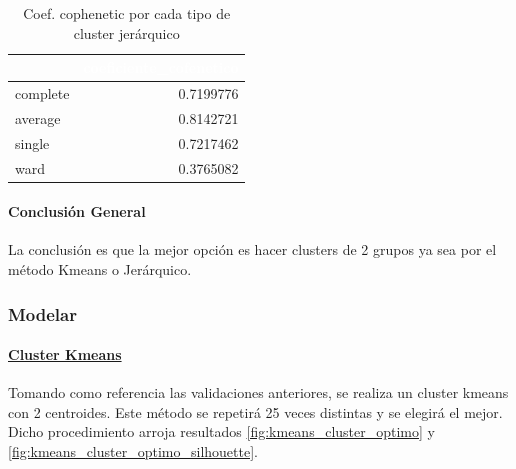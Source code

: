 \begin{table}[!h]
	
	\caption{\label{tab:tabla_cophenetic_jerarquico}Coef. cophenetic por cada tipo de cluster jerárquico}
	\centering
	\begin{tabular}[t]{lr}
		\toprule
		\rowcolor{black}  \multicolumn{1}{c}{\textcolor{white}{\textbf{metodo}}} & \multicolumn{1}{c}{\textcolor{white}{\textbf{coeficiente\_cofenetico}}}\\
		\midrule
		\rowcolor{gray!6}  complete & 0.7199776\\
		average & 0.8142721\\
		\rowcolor{gray!6}  single & 0.7217462\\
		ward & 0.3765082\\
		\bottomrule
	\end{tabular}
\end{table}



\paragraph{\textbf{Conclusión General}}
La conclusión es que la mejor opción es hacer clusters de 2 grupos ya sea por el método Kmeans o Jerárquico.


\subsubsection{\textbf{Modelar}}

\paragraph{\underline{\textbf{Cluster Kmeans}}}\label{cluster-kmeans}

Tomando como referencia las validaciones anteriores, se realiza un
cluster kmeans con 2 centroides. Este método se repetirá 25 veces
distintas y se elegirá el mejor.\\
Dicho procedimiento arroja resultados \ref{fig:kmeans_cluster_optimo} y \ref{fig:kmeans_cluster_optimo_silhouette}.

